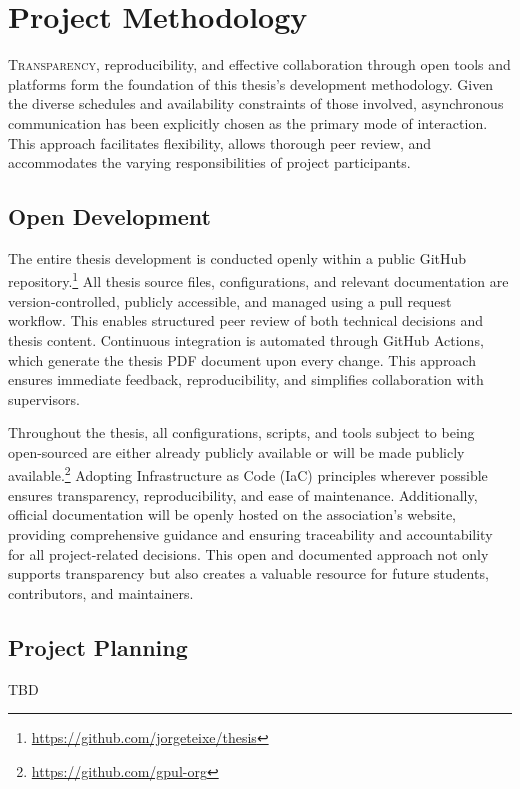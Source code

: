 %

\chapter{Project Methodology}
\label{chap:project-methodology}

\lettrine{T}{ransparency}, reproducibility, and effective collaboration through open tools and platforms form the foundation of this thesis's development methodology. Given the diverse schedules and availability constraints of those involved, asynchronous communication has been explicitly chosen as the primary mode of interaction. This approach facilitates flexibility, allows thorough peer review, and accommodates the varying responsibilities of project participants.

\section{Open Development}

The entire thesis development is conducted openly within a public GitHub repository.\footnote{\url{https://github.com/jorgeteixe/thesis}} All thesis source files, configurations, and relevant documentation are version-controlled, publicly accessible, and managed using a pull request workflow. This enables structured peer review of both technical decisions and thesis content. Continuous integration is automated through GitHub Actions, which generate the thesis PDF document upon every change. This approach ensures immediate feedback, reproducibility, and simplifies collaboration with supervisors.

Throughout the thesis, all configurations, scripts, and tools subject to being open-sourced are either already publicly available or will be made publicly available.\footnote{\url{https://github.com/gpul-org}} Adopting Infrastructure as Code (IaC) principles wherever possible ensures transparency, reproducibility, and ease of maintenance. Additionally, official documentation will be openly hosted on the association's website, providing comprehensive guidance and ensuring traceability and accountability for all project-related decisions. This open and documented approach not only supports transparency but also creates a valuable resource for future students, contributors, and maintainers.

\section{Project Planning}

TBD
